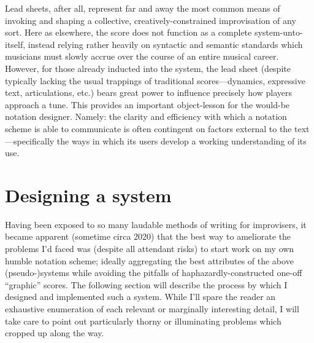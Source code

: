      \noindent Lead sheets, after all, represent far and away the most common means of invoking and shaping a collective, creatively-constrained improvisation of any sort. Here as elsewhere, the score does not function as a complete system-unto-itself, instead relying rather heavily on syntactic and semantic standards which musicians must slowly accrue over the course of an entire musical career. However, for those already inducted into the system, the lead sheet (despite typically lacking the usual trappings of traditional scores---dynamics, expressive text, articulations, etc.) bears great power to influence precisely how players approach a tune. This provides an important object-lesson for the would-be notation designer. Namely: the clarity and efficiency with which a notation scheme is able to communicate is often contingent on factors external to the text---specifically the ways in which its users develop a working understanding of its use.

\section{Designing a system}

    Having been exposed to so many laudable methods of writing for improvisers, it became apparent (sometime circa 2020) that the best way to ameliorate the problems I'd faced was (despite all attendant risks) to start work on my own humble notation scheme; ideally aggregating the best attributes of the above (pseudo-)systems while avoiding the pitfalls of haphazardly-constructed one-off ``graphic'' scores. The following section will describe the process by which I designed and implemented such a system. While I'll spare the reader an exhaustive enumeration of each relevant or marginally interesting detail, I will take care to point out particularly thorny or illuminating problems which cropped up along the way.

